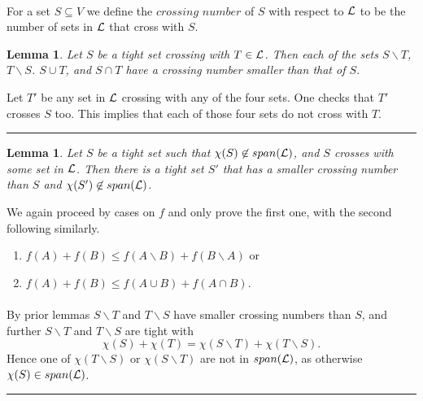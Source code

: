 \documentclass[letterpaper,12pt,oneside,onecolumn]{article}
\newenvironment{proof}{{\bf Proof:  }}{\hfill\rule{2mm}{2mm}}
\newtheorem{lemma}[fact]{Lemma}
\begin{document}
\paragraph{}
For a set $S \subseteq V$ we define the $\textit{crossing number}$ of $S$ with respect to $\mathcal{L}$ to be the number of sets in $\mathcal{L}$ that cross with $S$.
\begin{lemma}
Let $S$ be a tight set crossing with $T \in \mathcal{L}$. Then each of the sets $S\backslash T$, $T\backslash S$. $S\cup T$, and $S\cap T$ have a crossing number smaller than that of $S$.
\end{lemma}
\begin{proof}
Let $T'$ be any set in $\mathcal{L}$ crossing with any of the four sets. One checks that $T'$ crosses $S$ too. This implies that each of those four sets do not cross with $T$.
\end{proof}
\begin{lemma}
Let $S$ be a tight set such that $\chi(S)\not\in span(\mathcal{L})$, and $S$ crosses with some set in $\mathcal{L}$. Then there is a tight set $S'$ that has a smaller crossing number than $S$ and $\chi(S')\not\in span(\mathcal{L})$.
\end{lemma}
\begin{proof}
We again proceed by cases on $f$ and only prove the first one, with the second following similarly.
\begin{enumerate}
\item $f(A) + f(B) \leq f(A\backslash B) + f(B\backslash A)$ or
\item $f(A) + f(B) \leq f(A\cup B) + f(A \cap B)$.
\end{enumerate}
\paragraph{}
By prior lemmas $S\backslash T$ and $T\backslash S$ have smaller crossing numbers than $S$, and further $S\backslash T$ and $T\backslash S$ are tight with
$$\chi(S) + \chi(T) = \chi(S\backslash T) + \chi(T\backslash S).$$
Hence one of  $\chi(T\backslash S)$ or $\chi(S\backslash T)$ are not in $span(\mathcal{L})$, as otherwise $\chi(S) \in span(\mathcal{L})$.
\end{proof}
\end{document}
